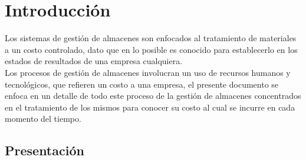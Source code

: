 

\chapter{Introducción}

Los sistemas de gestión de almacenes son enfocados al tratamiento de materiales a un costo controlado, dato que en lo posible es conocido para establecerlo en los estados de resultados de una empresa cualquiera.\\

Los procesos de gestión de almacenes involucran un uso de recursos humanos y tecnológicos, que refieren un costo a una empresa, el presente documento se enfoca en un detalle de todo este proceso de la gestión de almacenes concentrados en el tratamiento de los mismos para conocer su costo al cual se incurre en cada momento del tiempo.\\


\section{Presentación} %

